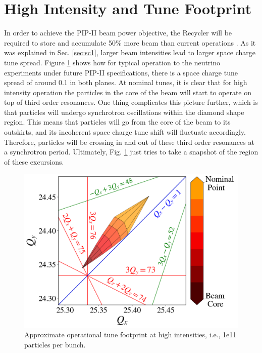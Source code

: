\section{High Intensity and Tune Footprint}

In order to achieve the PIP-II beam power objective, the Recycler will be required to store and accumulate 50\% more beam than current operations \cite{pipII1}. As it was explained in Sec. \ref{sec:sc1}, larger beam intensities lead to larger space charge tune spread. Figure \ref{fig:rrtdhigh} shows how for typical operation to the neutrino experiments under future PIP-II specifications, there is a space charge tune spread of around 0.1 in both planes. At nominal tunes, it is clear that for high intensity operation the particles in the core of the beam will start to operate on top of third order resonances. One thing complicates this picture further, which is that particles will undergo synchrotron oscillations within the diamond shape region. This means that particles will go from the core of the beam to its outskirts, and its incoherent space charge tune shift will fluctuate accordingly. Therefore, particles will be crossing in and out of these third order resonances at a synchrotron period. Ultimately, Fig. \ref{fig:rrtdhigh} just tries to take a snapshot of the region of these excursions.  

\begin{figure}[H]
   \centering
   \includegraphics[width=\columnwidth]{chapter3/rrtdhigh.png}
   \caption{Approximate operational tune footprint at high intensities, i.e., 1e11 particles per bunch.}
   \label{fig:rrtdhigh}
\end{figure}


